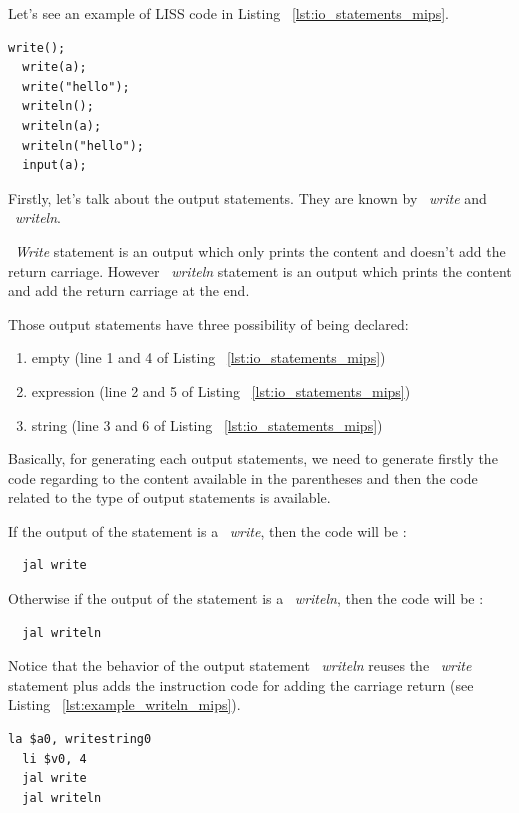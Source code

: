 \documentclass[
  oneside,
  11pt, a4paper,
  footinclude=true,
  headinclude=true,
  cleardoublepage=empty
]{scrbook}
\begin{document}
Let's see an example of LISS code in Listing ~\ref{lst:io_statements_mips}.

\begin{lstlisting}[caption={Example of I/O statements in LISS},label={lst:io_statements_mips}]
  write();
  write(a);
  write("hello");
  writeln();
  writeln(a);
  writeln("hello");
  input(a);
\end{lstlisting}

Firstly, let's talk about the output statements. They are known by ~\textit{write} and ~\textit{writeln}.

~\textit{Write} statement is an output which only prints the content and doesn't add the return carriage. However ~\textit{writeln} statement is an output which prints the content and add the return carriage at the end.

Those output statements have three possibility of being declared:

\begin{enumerate}
\item empty (line 1 and 4 of Listing ~\ref{lst:io_statements_mips})
\item expression (line 2 and 5 of Listing ~\ref{lst:io_statements_mips})
\item string (line 3 and 6 of Listing ~\ref{lst:io_statements_mips})
\end{enumerate}

Basically, for generating each output statements, we need to generate firstly the code regarding to the content available in the parentheses and then the code related to the type of output statements is available.

If the output of the statement is a ~\textit{write}, then the code will be :

\begin{lstlisting}
  jal write
\end{lstlisting}

Otherwise if the output of the statement is a ~\textit{writeln}, then the code will be :

\begin{lstlisting}	
  jal writeln
\end{lstlisting}

Notice that the behavior of the output statement ~\textit{writeln} reuses the ~\textit{write} statement plus adds the instruction code for adding the carriage return (see Listing ~\ref{lst:example_writeln_mips}).

\begin{lstlisting}[caption={Code generated for line 6 in Listing ~\ref{lst:io_statements_mips}},label={lst:example_writeln_mips}]
  la $a0, writestring0
  li $v0, 4
  jal write	
  jal writeln
\end{lstlisting}
\end{document}
